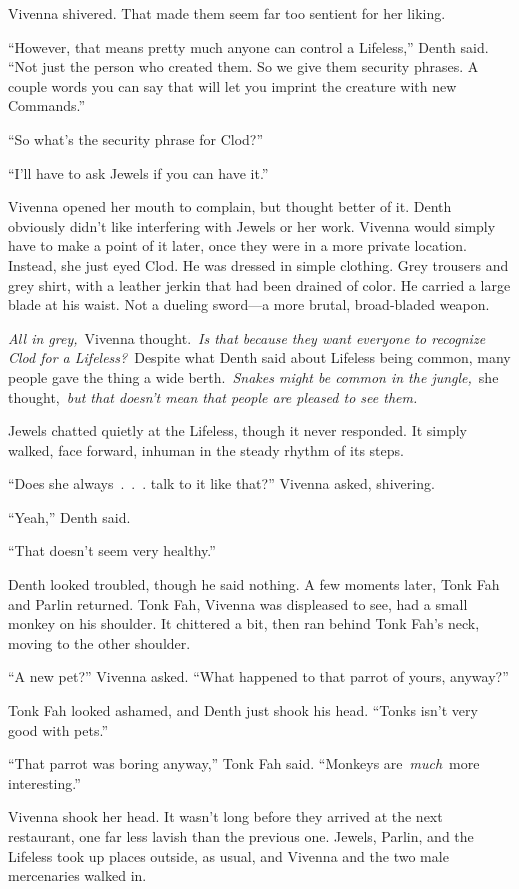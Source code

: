 Vivenna shivered. That made them seem far too sentient for her liking.

“However, that means pretty much anyone can control a Lifeless,” Denth said. “Not just the person who created them. So we give them security phrases. A couple words you can say that will let you imprint the creature with new Commands.”

“So what’s the security phrase for Clod?”

“I’ll have to ask Jewels if you can have it.”

Vivenna opened her mouth to complain, but thought better of it. Denth obviously didn’t like interfering with Jewels or her work. Vivenna would simply have to make a point of it later, once they were in a more private location. Instead, she just eyed Clod. He was dressed in simple clothing. Grey trousers and grey shirt, with a leather jerkin that had been drained of color. He carried a large blade at his waist. Not a dueling sword—a more brutal, broad-bladed weapon.

\textit{All in grey,}~Vivenna thought.~\textit{Is that because they want everyone to recognize Clod for a Lifeless?}~Despite what Denth said about Lifeless being common, many people gave the thing a wide berth.~\textit{Snakes might be common in the jungle,}~she thought,~\textit{but that doesn’t mean that people are pleased to see them.}

Jewels chatted quietly at the Lifeless, though it never responded. It simply walked, face forward, inhuman in the steady rhythm of its steps.

“Does she always~.~.~. talk to it like that?” Vivenna asked, shivering.

“Yeah,” Denth said.

“That doesn’t seem very healthy.”

Denth looked troubled, though he said nothing. A few moments later, Tonk Fah and Parlin returned. Tonk Fah, Vivenna was displeased to see, had a small monkey on his shoulder. It chittered a bit, then ran behind Tonk Fah’s neck, moving to the other shoulder.

“A new pet?” Vivenna asked. “What happened to that parrot of yours, anyway?”

Tonk Fah looked ashamed, and Denth just shook his head. “Tonks isn’t very good with pets.”

“That parrot was boring anyway,” Tonk Fah said. “Monkeys are~\textit{much}~more interesting.”

Vivenna shook her head. It wasn’t long before they arrived at the next restaurant, one far less lavish than the previous one. Jewels, Parlin, and the Lifeless took up places outside, as usual, and Vivenna and the two male mercenaries walked in.

